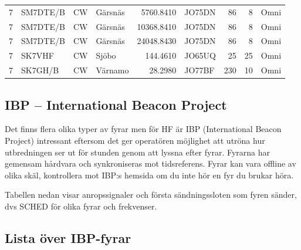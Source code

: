 {\begin{landscape}
\begin{longtable}{rlllrlrrl}
	                 7 & SM7DTE/B   & CW      & Gärsnäs                &    5760.8410 & JO75DN      &       86 &        8 & Omni         \\
	                 7 & SM7DTE/B   & CW      & Gärsnäs                &   10368.8410 & JO75DN      &       86 &        8 & Omni         \\
	                 7 & SM7DTE/B   & CW      & Gärsnäs                &   24048.8430 & JO75DN      &       86 &        8 & Omni         \\
	                 7 & SK7VHF     & CW      & Sjöbo                  &     144.4610 & JO65UQ      &       25 &       25 & Omni         \\
	                 7 & SK7GH/B    & CW      & Värnamo                &      28.2980 & JO77BF      &      230 &       10 & Omni
\end{longtable}
\end{landscape}

\clearpage

\subsection{IBP -- International Beacon Project}

Det finns flera olika typer av fyrar men för HF är IBP (International Beacon
Project) intressant eftersom det ger operatören möjlighet att utröna hur
utbredningen ser ut för stunden genom att lyssna efter fyrar. Fyrarna har
gemensam hårdvara och synkroniseras mot tidsreferens. Fyrar kan vara offline
av olika skäl, kontrollera mot IBP:s hemsida om du inte hör en fyr du brukar
höra.

Tabellen nedan visar anropssignaler och första sändningssloten som fyren
sänder, dvs SCHED för olika fyrar och frekvenser.

\subsection{Lista över IBP-fyrar}

}
